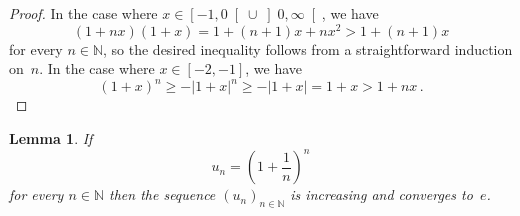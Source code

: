 \documentclass[12pt]{article}
\newcommand{\bN}{\mathbb{N}} %
\newcommand{\abs}[1]{\left| #1 \right|}
\newtheorem{lemma}{Lemma}
\begin{document}
\begin{proof}
  In the case where $x \in \left[- 1, 0 \right[ \cup \left]0, \infty \right[$, 
  we have 
  $$
  (1 + n x) (1 + x)
  = 1 + (n + 1) x + n x^2
  > 1 + (n + 1) x 
  $$
  for every $n \in \bN$, 
  so the desired inequality follows from a straightforward induction on~$n$.
  In the case where $x \in [-2, -1]$,
  we have 
  $$
  {(1 + x)}^n \ge - \abs{1 + x}^n \ge - \abs{1 + x} = 1 + x > 1 + n x \, .
  $$
\end{proof}


\begin{lemma} \label{lem:convergence-to-e}
  If
  $$
  u_n = \left( 1 + \frac{1}{n} \right)^n
  $$
  for every $n \in \bN$ then the sequence $\left( u_n  \right)_{n \in \bN}$ is increasing and converges to~$e$.
\end{lemma}
\end{document}
